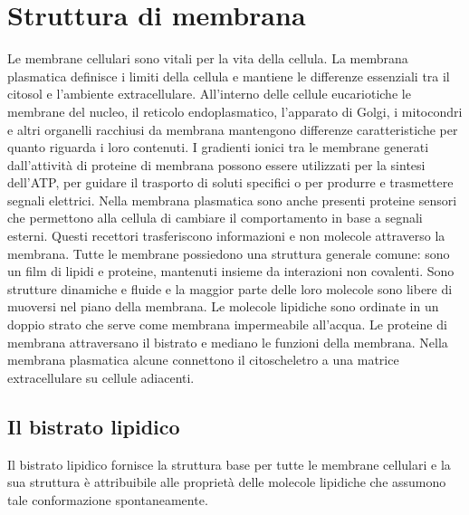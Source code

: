 \chapter{Struttura di membrana}
Le membrane cellulari sono vitali per la vita della cellula. La membrana plasmatica definisce i limiti della cellula e mantiene le differenze essenziali
tra il citosol e l'ambiente extracellulare. All'interno delle cellule eucariotiche le membrane del nucleo, il reticolo endoplasmatico, l'apparato di 
Golgi, i mitocondri e altri organelli racchiusi da membrana mantengono differenze caratteristiche per quanto riguarda i loro contenuti. I gradienti ionici
tra le membrane generati dall'attivit\`a di proteine di membrana possono essere utilizzati per la sintesi dell'ATP, per guidare il trasporto di soluti
specifici o per produrre e trasmettere segnali elettrici. Nella membrana plasmatica sono anche presenti proteine sensori che permettono alla cellula di 
cambiare il comportamento in base a segnali esterni. Questi recettori trasferiscono informazioni e non molecole attraverso la membrana. Tutte le membrane
possiedono una struttura generale comune: sono un film di lipidi e proteine, mantenuti insieme da interazioni non covalenti. Sono strutture dinamiche e 
fluide e la maggior parte delle loro molecole sono libere di muoversi nel piano della membrana. Le molecole lipidiche sono ordinate in un doppio strato 
che serve come membrana impermeabile all'acqua. Le proteine di membrana attraversano il bistrato e mediano le funzioni della membrana. Nella membrana 
plasmatica alcune connettono il citoscheletro a una matrice extracellulare su cellule adiacenti. 
\section{Il bistrato lipidico}
Il bistrato lipidico fornisce la struttura base per tutte le membrane cellulari e la sua struttura \`e attribuibile alle propriet\`a delle molecole 
lipidiche che assumono tale conformazione spontaneamente. 
